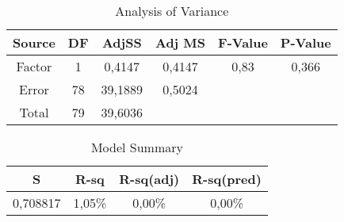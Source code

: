 \begin{table}
    \centering
    \begin{tabular}{c | c c c c c}
     Source & DF & AdjSS & Adj MS & F-Value & P-Value\\
     \hline
     Factor & 1 & 0,4147 & 0,4147 & 0,83 & 0,366 \\
     Error & 78 & 39,1889 & 0,5024 \\
     Total & 79 & 39,6036
     
    \end{tabular}
    \caption{Analysis of Variance}
    \label{tab:AnalVar}
\end{table}

\begin{table}
    \centering
    \begin{tabular}{c c c c}
     S & R-sq & R-sq(adj) & R-sq(pred) \\
     \hline
    0,708817 & 1,05\% & 0,00\% & 0,00\%
     
    \end{tabular}
    \caption{Model Summary}
    \label{tab:ModelSum}
\end{table}

